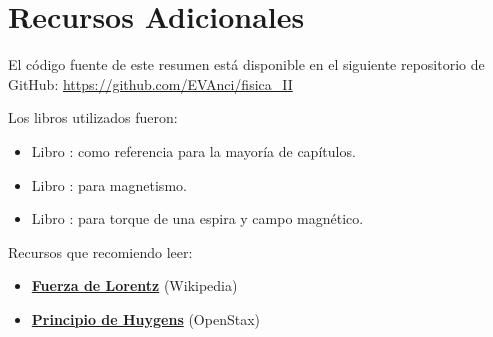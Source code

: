 \documentclass[a4paper,12pt]{article}  %
\begin{document}
  \section*{Recursos Adicionales}
  \noindent El código fuente de este resumen está disponible en el siguiente repositorio de GitHub: \url{https://github.com/EVAnci/fisica_II}
  \vspace{5pt}

  \noindent Los libros utilizados fueron:
  \begin{itemize}
    \item Libro \cite{Serway}: como referencia para la mayoría de capítulos.
    \item Libro \cite{Sears_Zemansky}: para magnetismo.
    \item Libro \cite{openstax}: para torque de una espira y campo magnético.
  \end{itemize}
  \vspace{5pt}
  
  \noindent Recursos que recomiendo leer:
  \begin{itemize}
    \item \href{https://es.wikipedia.org/wiki/Fuerza_de_Lorentz}{\textbf{Fuerza de Lorentz}} (Wikipedia)
    \item \href{https://openstax.org/books/f%C3%ADsica-universitaria-volumen-3/pages/1-6-principio-de-huygens}{\textbf{Principio de Huygens}} (OpenStax)
  \end{itemize}
  \newpage
  \printbibliography
\end{document}
